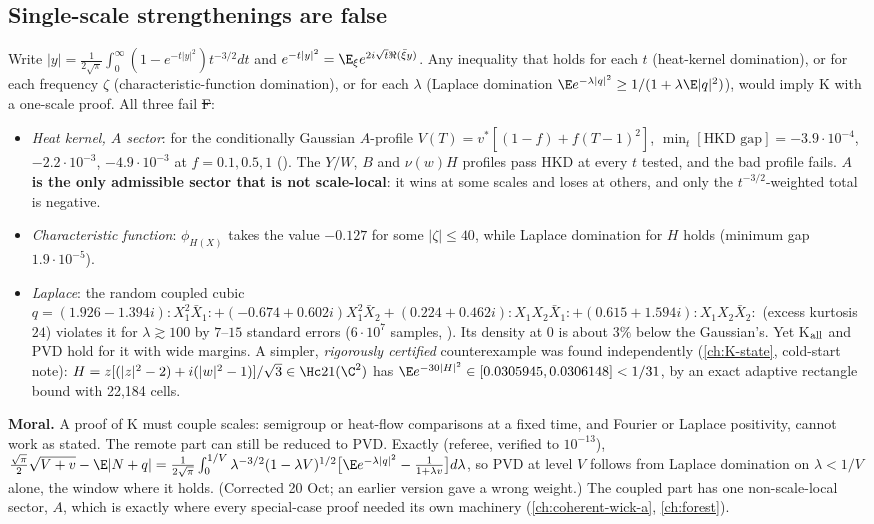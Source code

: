 \subsection{Single-scale strengthenings are false}
Write $|y|=\frac1{2\sqrt\pi}\int_0^\infty(1-e^{-t|y|^2})t^{-3/2}dt$ and $e^{-t|y|^2}=\E_\xi e^{2i\sqrt t\Re(\bar\xi y)}$. Any inequality that holds for each $t$ (heat-kernel domination),
or for each frequency $\zeta$ (characteristic-function domination), or for each $\lambda$ (Laplace domination $\E e^{-\lambda|q|^2}\ge1/(1+\lambda\E|q|^2)$), would imply K with a
one-scale proof. All three fail \st{F}:
\begin{itemize}
\item \emph{Heat kernel, $A$ sector}: for the conditionally Gaussian $A$-profile $V(T)=v^*[(1-f)+f(T-1)^2]$, $\min_t[\text{HKD gap}]=-3.9\cdot10^{-4}$, $-2.2\cdot10^{-3}$, $-4.9\cdot10^{-3}$ at
$f=0.1,0.5,1$ (). The $Y/W$, $B$ and $\nu(w)H$ profiles pass HKD at every $t$ tested, and the bad profile fails. \textbf{$A$ is the only admissible sector that is not
scale-local}: it wins at some scales and loses at others, and only the $t^{-3/2}$-weighted total is negative.
\item \emph{Characteristic function}: $\phi_{H(X)}$ takes the value $-0.127$ for some $|\zeta|\le40$, while Laplace domination for $H$ holds (minimum gap $1.9\cdot10^{-5}$).
\item \emph{Laplace}: the random coupled cubic
$q=(1.926-1.394i){:}X_1^2\bar X_1{:}+(-0.674+0.602i)X_1^2\bar X_2+(0.224+0.462i){:}X_1X_2\bar X_1{:}+(0.615+1.594i){:}X_1X_2\bar X_2{:}$ (excess kurtosis $24$) violates it for
$\lambda\gtrsim100$ by $7$--$15$ standard errors ($6\cdot10^7$ samples, ). Its density at $0$ is about $3\%$ below the Gaussian's. Yet K$_{\rm all}$ and PVD hold for it with
wide margins. A simpler, \emph{rigorously certified} counterexample was found independently (\autoref{ch:K-state}, cold-start note): $H=z[(|z|^2-2)+i(|w|^2-1)]/\sqrt3\in\Hc21(\C^2)$
has $\E e^{-30|H|^2}\in[0.0305945,0.0306148]<1/31$, by an exact adaptive rectangle bound with 22{,}184 cells.
\end{itemize}
\textbf{Moral.} A proof of K must couple scales: semigroup or heat-flow comparisons at a fixed time, and Fourier or Laplace positivity, cannot work as stated. The remote part can still be
reduced to PVD. Exactly (referee, verified to $10^{-13}$), $\tfrac{\sqrt\pi}2\sqrt{V+v}-\E|N+q|=\frac1{2\sqrt\pi}\int_0^{1/V}\lambda^{-3/2}(1-\lambda V)^{1/2}\bigl[\E e^{-\lambda|q|^2}-\tfrac1{1+\lambda v}\bigr]d\lambda$,
so PVD at level $V$ follows from Laplace domination on $\lambda<1/V$ alone, the window where it holds. (Corrected 20 Oct; an earlier version gave a wrong weight.) The coupled part has one non-scale-local
sector, $A$, which is exactly where every special-case proof needed its own machinery (\autoref{ch:coherent-wick-a}, \autoref{ch:forest}).

